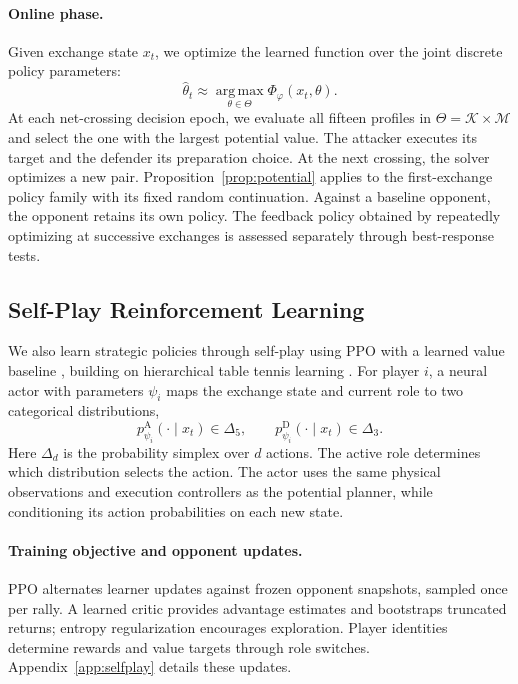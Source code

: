 \documentclass[pmlr]{jmlr}
\newcommand{\attack}{\mathrm{A}}
\newcommand{\defend}{\mathrm{D}}
\begin{document}
\paragraph{Online phase.}
Given exchange state $x_t$, we optimize the learned function over the joint discrete policy parameters:
\begin{equation}
  \widehat\theta_t\approx
  \operatorname*{arg\,max}_{\theta\in\Theta}\Phi_\varphi(x_t,\theta).
  \label{eq:onlinepotential}
\end{equation}
At each net-crossing decision epoch, we evaluate all fifteen profiles in $\Theta=\mathcal{K}\times\mathcal{M}$ and select the one with the largest potential value. The attacker executes its target and the defender its preparation choice. At the next crossing, the solver optimizes a new pair. Proposition~\ref{prop:potential} applies to the first-exchange policy family with its fixed random continuation.
Against a baseline opponent, the opponent retains its own policy. The feedback policy obtained by repeatedly optimizing at successive exchanges is assessed separately through best-response tests.

\subsection{Self-Play Reinforcement Learning}
\label{sec:selfplay}
We also learn strategic policies through self-play using PPO with a learned value baseline \citep{schulman2017ppo}, building on hierarchical table tennis learning \citep{mahjourian2018hierarchical}. For player $i$, a neural actor with parameters $\psi_i$ maps the exchange state and current role to two categorical distributions,
\begin{equation}
  p_{\psi_i}^{\attack}(\cdot\mid x_t)\in\Delta_5,
  \qquad p_{\psi_i}^{\defend}(\cdot\mid x_t)\in\Delta_3.
  \label{eq:rlheads}
\end{equation}
Here $\Delta_d$ is the probability simplex over $d$ actions. The active role determines which distribution selects the action. The actor uses the same physical observations and execution controllers as the potential planner, while conditioning its action probabilities on each new state.

\paragraph{Training objective and opponent updates.}
PPO alternates learner updates against frozen opponent snapshots, sampled once per rally. A learned critic provides advantage estimates and bootstraps truncated returns; entropy regularization encourages exploration. Player identities determine rewards and value targets through role switches. Appendix~\ref{app:selfplay} details these updates.
\end{document}
